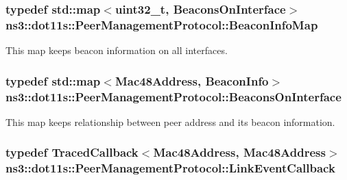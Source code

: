 \subsubsection[{\texorpdfstring{Beacon\+Info\+Map}{BeaconInfoMap}}]{\setlength{\rightskip}{0pt plus 5cm}typedef std\+::map$<$uint32\+\_\+t, {\bf Beacons\+On\+Interface}$>$ {\bf ns3\+::dot11s\+::\+Peer\+Management\+Protocol\+::\+Beacon\+Info\+Map}\hspace{0.3cm}{\ttfamily [private]}}\hypertarget{classns3_1_1dot11s_1_1PeerManagementProtocol_a64ff032a1e847fb139322aca90d96d8f}{}\label{classns3_1_1dot11s_1_1PeerManagementProtocol_a64ff032a1e847fb139322aca90d96d8f}


This map keeps beacon information on all interfaces. 

\subsubsection[{\texorpdfstring{Beacons\+On\+Interface}{BeaconsOnInterface}}]{\setlength{\rightskip}{0pt plus 5cm}typedef std\+::map$<${\bf Mac48\+Address}, {\bf Beacon\+Info}$>$ {\bf ns3\+::dot11s\+::\+Peer\+Management\+Protocol\+::\+Beacons\+On\+Interface}\hspace{0.3cm}{\ttfamily [private]}}\hypertarget{classns3_1_1dot11s_1_1PeerManagementProtocol_a0a15aa4827ac49dc6dfd2c808fdde1a0}{}\label{classns3_1_1dot11s_1_1PeerManagementProtocol_a0a15aa4827ac49dc6dfd2c808fdde1a0}


This map keeps relationship between peer address and its beacon information. 

\subsubsection[{\texorpdfstring{Link\+Event\+Callback}{LinkEventCallback}}]{\setlength{\rightskip}{0pt plus 5cm}typedef {\bf Traced\+Callback}$<${\bf Mac48\+Address}, {\bf Mac48\+Address}$>$ {\bf ns3\+::dot11s\+::\+Peer\+Management\+Protocol\+::\+Link\+Event\+Callback}\hspace{0.3cm}{\ttfamily [private]}}\hypertarget{classns3_1_1dot11s_1_1PeerManagementProtocol_abd87274ae9ac4498dbd5a8acfe7e9efa}{}\label{classns3_1_1dot11s_1_1PeerManagementProtocol_abd87274ae9ac4498dbd5a8acfe7e9efa}


